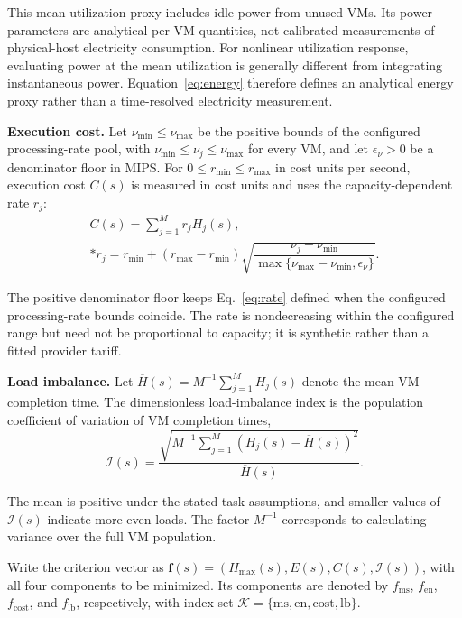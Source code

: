 \documentclass[pdflatex,onecolumn,sn-mathphys-num]{sn-jnl}
\begin{document}
This mean-utilization proxy includes idle power from unused VMs. Its power parameters are analytical per-VM quantities, not calibrated measurements of physical-host electricity consumption. For nonlinear utilization response, evaluating power at the mean utilization is generally different from integrating instantaneous power. Equation~\eqref{eq:energy} therefore defines an analytical energy proxy rather than a time-resolved electricity measurement.

\begin{samepage}
\textbf{Execution cost.}
Let $\nu_{\mathrm{min}}\leq\nu_{\mathrm{max}}$ be the positive bounds of the configured processing-rate pool, with $\nu_{\mathrm{min}}\leq\nu_j\leq\nu_{\mathrm{max}}$ for every VM, and let $\epsilon_{\nu}>0$ be a denominator floor in MIPS. For $0\leq r_{\mathrm{min}}\leq r_{\mathrm{max}}$ in cost units per second, execution cost $C(s)$ is measured in cost units and uses the capacity-dependent rate $r_j$:
\begin{gather}
C(s)=\sum_{j=1}^{M}r_jH_j(s),\label{eq:cost}\\*
r_j=r_{\mathrm{min}}+(r_{\mathrm{max}}-r_{\mathrm{min}})\sqrt{\dfrac{\nu_j-\nu_{\mathrm{min}}}{\max\{\nu_{\mathrm{max}}-\nu_{\mathrm{min}},\epsilon_{\nu}\}}}.\label{eq:rate}
\end{gather}
\end{samepage}

The positive denominator floor keeps Eq.~\eqref{eq:rate} defined when the configured processing-rate bounds coincide. The rate is nondecreasing within the configured range but need not be proportional to capacity; it is synthetic rather than a fitted provider tariff.

\textbf{Load imbalance.}
Let $\overline{H}(s)=M^{-1}\sum_{j=1}^{M}H_j(s)$ denote the mean VM completion time. The dimensionless load-imbalance index is the population coefficient of variation of VM completion times,
\begin{equation}\label{eq:lbr}
\mathcal{I}(s)=\frac{\sqrt{\displaystyle M^{-1}\sum_{j=1}^{M}(H_j(s)-\overline{H}(s))^2}}{\overline{H}(s)}.
\end{equation}

The mean is positive under the stated task assumptions, and smaller values of $\mathcal{I}(s)$ indicate more even loads. The factor $M^{-1}$ corresponds to calculating variance over the full VM population.

Write the criterion vector as $\mathbf{f}(s)=(H_{\mathrm{max}}(s),E(s),C(s),\mathcal{I}(s))$, with all four components to be minimized. Its components are denoted by $f_{\mathrm{ms}}$, $f_{\mathrm{en}}$, $f_{\mathrm{cost}}$, and $f_{\mathrm{lb}}$, respectively, with index set $\mathcal{K}=\{\mathrm{ms},\mathrm{en},\mathrm{cost},\mathrm{lb}\}$.
\end{document}
